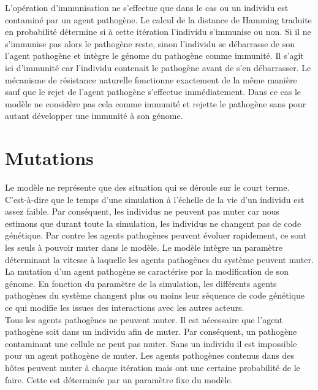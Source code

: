 L'opération d'immunisation ne s'effectue que dans le cas ou un individu est contaminé par un agent pathogène. Le calcul de la distance de Hamming traduite en probabilité détermine si à cette itération l'individu s'immunise ou non. Si il ne s'immunise pas alors le pathogène reste, sinon l'individu se débarrasse de son l'agent pathogène et intègre le génome du pathogène comme immunité. Il s'agit ici d'immunité car l'individu contenait le pathogène avant de s'en débarrasser. Le mécanisme de résistance naturelle fonctionne exactement de la même manière sauf que le rejet de l'agent pathogène s'effectue immédiatement. Dans ce cas le modèle ne considère pas cela comme immunité et rejette le pathogène sans pour autant développer une immunité à son génome.

\section{Mutations}

Le modèle ne représente que des situation qui se déroule sur le court terme. C'est-à-dire que le temps d'une simulation à l'échelle de la vie d'un individu est assez faible. Par conséquent, les individus ne peuvent pas muter car nous estimons que durant toute la simulation, les individus ne changent pas de code génétique. Par contre les agents pathogènes peuvent évoluer rapidement, ce sont les seuls à pouvoir muter dans le modèle. Le modèle intègre un paramètre déterminant la vitesse à laquelle les agents pathogènes du système peuvent muter.\\

La mutation d'un agent pathogène se caractérise par la modification de son génome. En fonction du paramètre de la simulation, les différents agents pathogènes du système changent plus ou moins leur séquence de code génétique ce qui modifie les issues des interactions avec les autres acteurs.\\

Tous les agents pathogènes ne peuvent muter. Il est nécessaire que l'agent pathogène soit dans un individu afin de muter. Par conséquent, un pathogène contaminant une cellule ne peut pas muter. Sans un individu il est impossible pour un agent pathogène de muter. Les agents pathogènes contenus dans des hôtes peuvent muter à chaque itération mais ont une certaine probabilité de le faire. Cette est déterminée par un paramètre fixe du modèle.